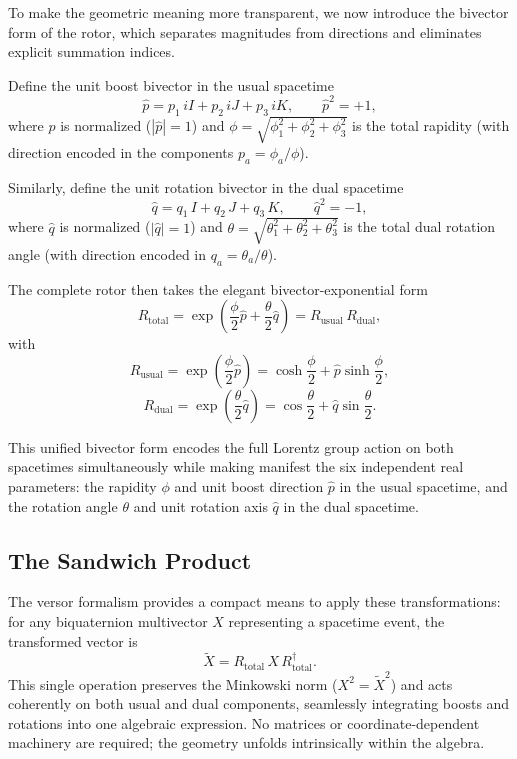 \documentclass[dvipdfmx,a4paper]{article}
\begin{document}
To make the geometric meaning more transparent, we now introduce the bivector form of the rotor, which separates magnitudes from directions and eliminates explicit summation indices.

Define the unit boost bivector in the usual spacetime
\[
\hat{p} = p_1 \, iI + p_2 \, iJ + p_3 \, iK, \qquad \hat{p}^2 = +1,
\]
where $\hat{p}$ is normalized ($|\hat{p}| = 1$) and $\phi = \sqrt{\phi_1^2 + \phi_2^2 + \phi_3^2}$ is the total rapidity (with direction encoded in the components $p_a = \phi_a / \phi$).

Similarly, define the unit rotation bivector in the dual spacetime
\[
\hat{q} = q_1 \, I + q_2 \, J + q_3 \, K, \qquad \hat{q}^2 = -1,
\]
where $\hat{q}$ is normalized ($|\hat{q}| = 1$) and $\theta = \sqrt{\theta_1^2 + \theta_2^2 + \theta_3^2}$ is the total dual rotation angle (with direction encoded in $q_a = \theta_a / \theta$).

The complete rotor then takes the elegant bivector-exponential form
\[
R_\text{total} = \exp\!\left( \frac{\phi}{2} \hat{p} + \frac{\theta}{2} \hat{q} \right)
= R_\text{usual} \, R_\text{dual},
\]
with
\[
R_\text{usual} = \exp\!\left( \frac{\phi}{2} \hat{p} \right)
= \cosh\frac{\phi}{2} + \hat{p} \sinh\frac{\phi}{2},
\]
\[
R_\text{dual} = \exp\!\left( \frac{\theta}{2} \hat{q} \right)
= \cos\frac{\theta}{2} + \hat{q} \sin\frac{\theta}{2}.
\]

This unified bivector form encodes the full Lorentz group action on both spacetimes simultaneously while making manifest the six independent real parameters: the rapidity $\phi$ and unit boost direction $\hat{p}$ in the usual spacetime, and the rotation angle $\theta$ and unit rotation axis $\hat{q}$ in the dual spacetime.

\subsection{The Sandwich Product}

The versor formalism provides a compact means to apply these transformations: for any biquaternion multivector $X$ representing a spacetime event, the transformed vector is
\[
\tilde{X} = R_\text{total} \, X \, R_\text{total}^\dagger.
\]
This single operation preserves the Minkowski norm ($X^2 = \tilde{X}^2$) and acts coherently on both usual and dual components, seamlessly integrating boosts and rotations into one algebraic expression. No matrices or coordinate-dependent machinery are required; the geometry unfolds intrinsically within the algebra.
\end{document}
